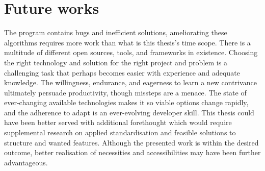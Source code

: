 \section{Future works}
The program contains bugs and inefficient solutions, ameliorating these algorithms requires more work than what is this thesis's time scope. There is a multitude of different open sources, tools, and frameworks in existence. Choosing the right technology and solution for the right project and problem is a challenging task that perhaps becomes easier with experience and adequate knowledge. The willingness, endurance, and eagerness to learn a new contrivance ultimately persuade productivity, though missteps are a menace. The state of ever-changing available technologies makes it so viable options change rapidly, and the adherence to adapt is an ever-evolving developer skill. This thesis could have been better served with additional forethought which would require supplemental research on applied standardisation and feasible solutions to structure and wanted features. Although the presented work is within the desired outcome, better realisation of necessities and accessibilities may have been further advantageous.


